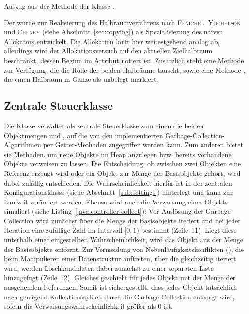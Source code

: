 \begin{listing}[h]
	\inputminted[]{java}{code/NaiveAlloc-allocate.java}
	\caption[Methode  der Klasse ]{Auszug aus der Methode  der Klasse .}
	\label{java:naive-alloc}
\end{listing}

Der  wurde zur Realisierung des Halbraumverfahrens nach \textsc{Fenichel}, \textsc{Yochelson} und \textsc{Cheney} (siehe Abschnitt~\ref{sec:copying}) als Spezialisierung des naiven Allokators entwickelt.
Die Allokation läuft hier weitestgehend analog ab, allerdings wird der Allokationsversuch auf den aktuellen Zielhalbraum beschränkt, dessen Beginn im Attribut  notiert ist.
Zusätzlich steht eine Methode  zur Verfügung, die die Rolle der beiden Halbräume tauscht, sowie eine Methode , die einen Halbraum in Gänze als unbelegt markiert.

\subsection{Zentrale Steuerklasse }
\label{sub:controller}
Die Klasse  verwaltet als zentrale Steuerklasse zum einen die beiden Objektmengen  und , auf die von den implementierten Garbage-Collection-Algorithmen per Getter-Methoden zugegriffen werden kann.
Zum anderen bietet sie Methoden, um neue Objekte im Heap anzulegen bzw. bereits vorhandene Objekte verwaisen zu lassen.
Die Entscheidung, ob zwischen zwei Objekten eine Referenz erzeugt wird oder ein Objekt zur Menge der Basisobjekte gehört, wird dabei zufällig entschieden.
Die Wahrscheinlichkeit hierfür ist in der zentralen Konfigurationsklasse  (siehe Abschnitt~\ref{sub:settings}) hinterlegt und kann zur Laufzeit verändert werden.
Ebenso wird auch die Verwaisung eines Objekts simuliert (siehe Listing~\ref{java:controller-collect}):
Vor Auslösung der Garbage Collection wird zunächst über die Menge der Basisobjekte iteriert und bei jeder Iteration eine zufällige Zahl im Intervall $[0,1)$ bestimmt (Zeile~11).
Liegt diese unterhalb einer eingestellten Wahrscheinlichkeit, wird das Objekt aus der Menge der Basisobjekte entfernt.
Zur Vermeidung von Nebenläufigkeitskonflikten (), die beim Manipulieren einer Datenstruktur auftreten, über die gleichzeitig iteriert wird, werden Löschkandidaten dabei zunächst zu einer separaten Liste hinzugefügt (Zeile~12).
Gleiches geschieht für jedes Objekt mit der Menge  der ausgehenden Referenzen.
Somit ist sichergestellt, dass jedes Objekt tatsächlich nach genügend Kollektionszyklen durch die Garbage Collection entsorgt wird, sofern die Verwaisungswahrscheinlichkeit größer als $0$ ist.

